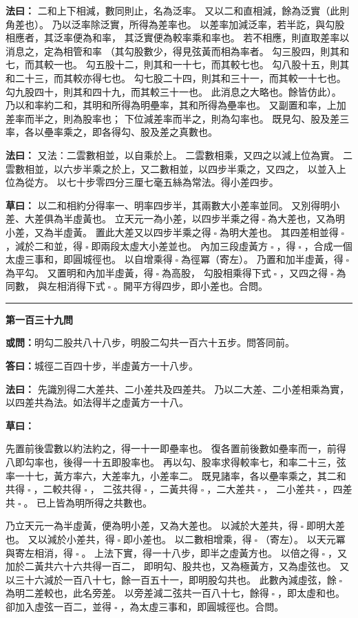 \documentclass[11pt,a4paper]{article}
\let\origsquare\square
\renewcommand{\square}{\ensuremath{\origsquare}}%
\newcommand{\longline}{\noindent\rule{\textwidth}{0.4pt}}
\newcommand{\owen}[1]{%
  \par\vspace{0.4em}%
  \noindent\textcolor{problemcolor}{\textbf{或問：}}{\tradfont #1}\par\nopagebreak%
}
\newcommand{\fayue}[1]{%
  \par\noindent\textcolor{methodcolor}{\textbf{法曰：}}{\tradfont #1}\par\nopagebreak%
}
\newcommand{\tsaoyue}[1]{%
  \par\noindent\textcolor{workcolor}{\textbf{草曰：}}{\tradfont #1}\par%
}
\newcommand{\dayue}[1]{%
  \par\noindent\textcolor{anscolor}{\textbf{答曰：}}{\tradfont #1}\par\nopagebreak%
}
\newcommand{\wen}[1]{\par\vspace{0.3em}\noindent\textcolor{problemcolor}{\textbf{第#1問}}\par}
\begin{document}
\fayue{%
二和上下相減，數同則止，名為泛率。
又以二和直相減，餘為泛實（此則角差也）。
乃以泛率除泛實，所得為差率也。
以差率加減泛率，若半訖，與勾股相應者，其泛率便為和率，
其泛實便為較率乘和率也。
若不相應，則直取差率以消息之，定為相管和率
（其勾股數少，得見弦黃而相為率者。
勾三股四，則其和七，而其較一也。
勾五股十二，則其和一十七，而其較七也。
勾八股十五，則其和二十三，而其較亦得七也。
勾七股二十四，則其和三十一，而其較一十七也。
勾九股四十，則其和四十九，而其較三十一也。
此消息之大略也。餘皆仿此）。
乃以和率約二和，其明和所得為明壘率，其和所得為壘率也。
又副置和率，上加差率而半之，則為股率也；
下位減差率而半之，則為勾率也。
既見勾、股及差三率，各以壘率乘之，即各得勾、股及差之真數也。}

\fayue{%
又法：二雲數相並，以自乘於上。
二雲數相乘，又四之以減上位為實。
二雲數相並，以六步半乘之於上，又二數相並，以四步半乘之，又四之，
以並入上位為從方。
以七十步零四分三厘七毫五絲為常法。得小差四步。}

\tsaoyue{%
以二和相約分得率一、明率四步半，其兩數大小差率並同。
又別得明小差、大差俱為半虛黃也。
立天元一為小差，以四步半乘之得$ \; \square \; $為大差也，又為明小差，又為半虛黃。
置此大差又以四步半乘之得$ \; \square \; $為明大差也。
其四差相並得$ \; \square \; $，減於二和並，得$ \; \square \; $即兩段太虛大小差並也。
內加三段虛黃方$ \; \square \; $，得$ \; \square \; $，合成一個太虛三事和，即圓城徑也。
以自增乘得$ \; \square \; $為徑冪（寄左）。
乃置和加半虛黃，得$ \; \square \; $為平勾。
又置明和內加半虛黃，得$ \; \square \; $為高股，
勾股相乘得下式$ \; \square \; $，又四之得$ \; \square \; $為同數，
與左相消得下式$ \; \square \; $。開平方得四步，即小差也。合問。}

\vspace{0.5cm}
\begin{center}
\longline
\end{center}

\wen{一百三十九}
\owen{明勾二股共八十八步，明股二勾共一百六十五步。問答同前。}
\dayue{城徑二百四十步，半虛黃方一十八步。}

\fayue{%
先識別得二大差共、二小差共及四差共。
乃以二大差、二小差相乘為實，以四差共為法。如法得半之虛黃方一十八。}

\tsaoyue{%
先置前後雲數以約法約之，得一十一即壘率也。
復各置前後數如壘率而一，前得八即勾率也，後得一十五即股率也。
再以勾、股率求得較率七，和率二十三，弦率一十七，黃方率六，大差率九，小差率二。
既見諸率，各以壘率乘之，其二和共得$ \; \square \; $，二較共得$ \; \square \; $，
二弦共得$ \; \square \; $，二黃共得$ \; \square \; $，二大差共$ \; \square \; $，
二小差共$ \; \square \; $，四差共$ \; \square \; $。
已上皆為明所得之共數也。

乃立天元一為半虛黃，便為明小差，又為大差也。
以減於大差共，得$ \; \square \; $即明大差也。
又以減於小差共，得$ \; \square \; $即小差也。
以二數相增乘，得$ \; \square \; $（寄左）。
以天元冪與寄左相消，得$ \; \square \; $。
上法下實，得一十八步，即半之虛黃方也。
以倍之得$ \; \square \; $，又加於二黃共六十六共得一百二，
即明勾、股共也，又為極黃方，又為虛弦也。
又以三十六減於一百八十七，餘一百五十一，即明股勾共也。
此數內減虛弦，餘$ \; \square \; $為明二差較也，此名旁差。
以旁差減二弦共一百八十七，餘得$ \; \square \; $，即太虛和也。
卻加入虛弦一百二，並得$ \; \square \; $，為太虛三事和，即圓城徑也。合問。}
\end{document}
